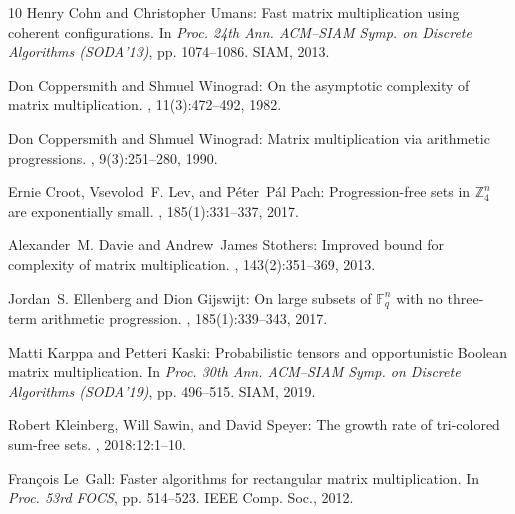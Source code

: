 \documentclass[11pt]{article}
\numberwithin{equation}{section}
\theoremstyle{definition}
\theoremstyle{plain}
\theoremstyle{definition}
\begin{document}
\begin{thebibliography}{10}
{\sc Henry Cohn and Christopher Umans}: Fast matrix multiplication using
  coherent configurations.
\newblock In {\em Proc. 24th Ann. ACM--SIAM Symp. on Discrete Algorithms
  (SODA'13)}, pp. 1074--1086. SIAM, 2013.
\newblock [\epfmtdoi{10.1137/1.9781611973105.77}]

{\sc Don Coppersmith and Shmuel Winograd}: On the asymptotic complexity of
  matrix multiplication.
, 11(3):472--492, 1982.
\newblock [\epfmtdoi{10.1137/0211038}]

{\sc Don Coppersmith and Shmuel Winograd}: Matrix multiplication via arithmetic
  progressions.
, 9(3):251--280, 1990.
\newblock [\epfmtdoi{10.1016/S0747-7171(08)80013-2}]

{\sc Ernie Croot, Vsevolod~F. Lev, and P{\'e}ter~P{\'a}l Pach}:
  Progression-free sets in $\mathbb{Z}_4^n$ are exponentially small.
, 185(1):331--337, 2017.

{\sc Alexander~M. Davie and Andrew~James Stothers}: Improved bound for
  complexity of matrix multiplication.
, 143(2):351--369, 2013.
\newblock [\epfmtdoi{10.1017/S0308210511001648}]

{\sc Jordan~S. Ellenberg and Dion Gijswijt}: On large subsets of
  $\mathbb{F}_q^n$ with no three-term arithmetic progression.
, 185(1):339--343, 2017.

{\sc Matti Karppa and Petteri Kaski}: Probabilistic tensors and opportunistic
  {Boolean} matrix multiplication.
\newblock In {\em Proc. 30th Ann. ACM--SIAM Symp. on Discrete Algorithms
  (SODA'19)}, pp. 496--515. SIAM, 2019.
\newblock [\epfmtdoi{10.1137/1.9781611975482.31}]

{\sc Robert Kleinberg, Will Sawin, and David Speyer}: The growth rate of
  tri-colored sum-free sets.
, 2018:12:1--10.
\newblock [\epfmtdoi{10.19086/da.3734}]

{\sc Fran{\c{c}}ois Le~Gall}: Faster algorithms for rectangular matrix
  multiplication.
\newblock In {\em Proc. 53rd FOCS}, pp. 514--523. IEEE Comp. Soc., 2012.


\end{thebibliography}
\end{document}
